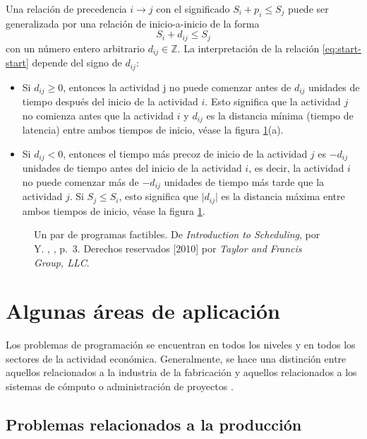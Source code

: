 \documentclass[spanish,draft,12pt,headsepline,footsepline,paper=letter]{scrreprt}
\begin{document}
Una relación de precedencia $i \to j$ con el significado $S_i+p_i \leq S_j$ puede ser generalizada por una relación de inicio-a-inicio de la forma 
\begin{equation} 
S_i + d_{ij} \leq S_j 
\label{eq:start-start}
\end{equation}
con un número entero arbitrario $d_{ij} \in \mathbb{Z}$. La interpretación de la relación \ref{eq:start-start} depende del signo de $d_{ij}$:

\begin{itemize}
  \item Si $d_{ij} \geq 0$, entonces la actividad j no puede comenzar antes de $d_{ij}$ unidades de tiempo después del inicio de la actividad $i$. Esto significa que la actividad $j$ no comienza antes que la actividad $i$ y $d_{ij}$ es la distancia mínima (tiempo de latencia) entre ambos tiempos de inicio, véase la figura \ref{fig:time-lags}(a).
  \item Si $d_{ij} < 0$, entonces el tiempo más precoz de inicio de la actividad $j$ es $-d_{ij}$ unidades de tiempo antes del inicio de la actividad $i$, es decir, la actividad $i$ no puede comenzar más de $-d_{ij}$ unidades de tiempo más tarde que la actividad $j$. Si $S_j \leq S_i$, esto significa que $\lvert d_{ij} \lvert$ es la distancia máxima entre ambos tiempos de inicio, véase la figura \ref{fig:time-lags}.
\end{itemize}

\begin{figure}[hbtp]
  \centering
  
  \caption[Programas factibles]{Un par de programas factibles. De \textit{Introduction to Scheduling}, por Y. \citeauthor{Robert2010}, \citeyear{Robert2010}, p.~3. Derechos reservados [2010] por \textit{Taylor and Francis Group, LLC}.}
  \label{fig:time-lags}
\end{figure}

\section{Algunas áreas de aplicación}
\label{algunas_areas_aplicacion}

Los problemas de programación se encuentran en todos los niveles y en todos los sectores de la actividad económica. Generalmente, se hace una distinción entre aquellos relacionados a la industria de la fabricación y aquellos relacionados a los sistemas de cómputo o administración de proyectos \citep[p.~6]{TKindt2002}.

\subsection{Problemas relacionados a la producción} %
\label{problemas_relacionados_produccion}
\end{document}
